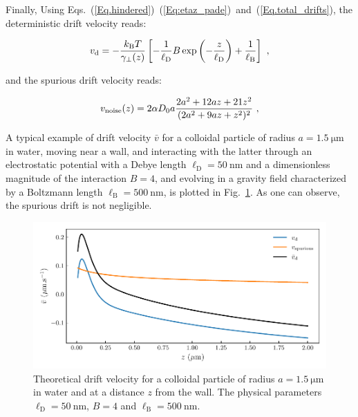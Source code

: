 Finally, Using  Eqs.~(\ref{Eq.hindered})~(\ref{Eq:etaz_pade})~and~(\ref{Eq.total_drifts}), the deterministic drift velocity reads:

\begin{equation}
	v_\textnormal{d} =- \frac{k_\mathrm{B}T}{\gamma_\bot(z)} \left[- \frac{1}{\ell_\mathrm{D}} B \exp \left(- \frac{z}{\ell_\mathrm{D}}\right) + \frac{1}{\ell_\mathrm{B}}\right] ~,
\end{equation}

and the spurious drift velocity reads:

\begin{equation}
	v_\textnormal{noise} (z)= 2 \alpha D_0 a\frac{2a^2 + 12 az + 21 z^2}{(2 a^2 + 9az + z^2) ^2} ~,
	\label{Eq.spurious_drift}
\end{equation}

A typical example of drift velocity $\bar{v}$ for a colloidal particle of radius $a = 1.5 ~\mathrm{\mu m}$ in water, moving near a wall, and interacting with the latter through an electrostatic potential with a Debye length $\ell_\mathrm{D} = 50 ~ \mathrm{nm}$ and a dimensionless magnitude of the interaction $B = 4$, and evolving in a gravity field characterized by a Boltzmann length $\ell_\mathrm{B} = 500 ~ \mathrm{nm}$, is plotted in Fig.~\ref{fig.spurious}. As one can observe, the spurious drift is not negligible.

\begin{figure}[ht]
	\centering
	\includegraphics{02_body/chapter3/images/spurious_drift/spurious.pdf}
	\caption{Theoretical drift velocity for a colloidal particle of radius $a = 1.5 ~\mathrm{\mu m}$ in water and at a distance $z$ from the wall. The physical parameters $\ell_\mathrm{D} = 50 ~ \mathrm{nm}$, $B = 4 $ and $\ell_\mathrm{B} = 500 ~ \mathrm{nm}$. \href{https://github.com/eXpensia/Confined-Brownian-Motion/blob/main/02_body/chapter3/images/spurious_drift/spurious_drift.ipynb}{\faGithub}} 
	\label{fig.spurious}
\end{figure}


